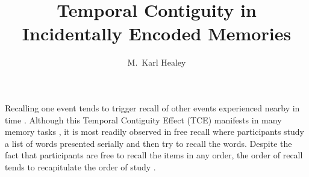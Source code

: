 \documentclass[man,natbib,floatsintext]{apa6} %
\title{Temporal Contiguity in Incidentally Encoded Memories}
\author{M.\ Karl Healey}
\affiliation{Michigan State University}
\begin{document}
\maketitle
\label{TODO-1}

\color{red}
Recalling one event tends to trigger recall of other events experienced nearby in time \citep[for a review, see][]{HealKaha17}. Although this Temporal Contiguity Effect (TCE) manifests in many memory tasks \citep{DaviEtal08,SchwEtal05}, it is most readily observed in free recall where participants study a list of words presented serially and then try to recall the words. Despite the fact that participants are free to recall the items in any order, the order of recall tends to recapitulate the order of study \citep{Murd74,Post71,Post72,Kaha96}. %
\end{document}
